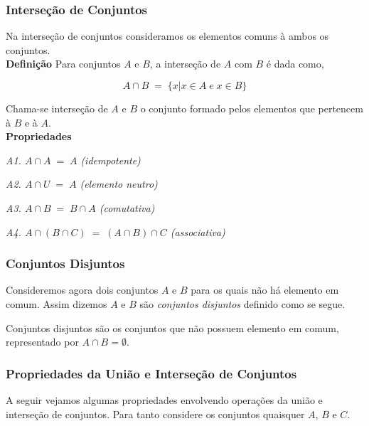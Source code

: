 \subsubsection{Interseção de Conjuntos}

Na interseção de conjuntos consideramos os elementos comuns à ambos os conjuntos. \\


\noindent
\textbf{Definição} Para conjuntos $A$ e $B$, a interseção de $A$ com $B$ é dada como, 

$$ A \cap B \; = \; \{x | x\in A \; e \; x \in B \} $$ 

Chama-se interseção de $A$ e $B$ o conjunto formado pelos elementos que pertencem à $B$ e à $A$. \\


\noindent
\textbf{Propriedades}

\noindent
\emph{A1. $ A \cap A\; = \; A $ (idempotente)}

\noindent
\emph{A2. $A \cap U \;= \; A $ (elemento neutro) } 

\noindent
\emph{A3.  $ A \cap B \; = \; B \cap A $ (comutativa)}

\noindent
\emph{A4. $ A \cap ( B\cap C) \; = \; ( A \cap B ) \cap C $ (associativa)}


\subsubsection{Conjuntos Disjuntos}

Consideremos agora dois conjuntos $A$ e $B$ para os quais não há elemento em comum. Assim dizemos $A$ e $B$ são \textit{conjuntos disjuntos} definido como se segue.
\begin{definition}
	Conjuntos disjuntos são os conjuntos que não possuem elemento em comum, representado por $ A \cap B = \emptyset $.
\end{definition}

\subsubsection{Propriedades da União e Interseção de Conjuntos} 

A seguir vejamos algumas propriedades envolvendo operações da união e interseção de conjuntos. Para tanto considere os conjuntos quaisquer $A$, $B$ e $C$. \\


